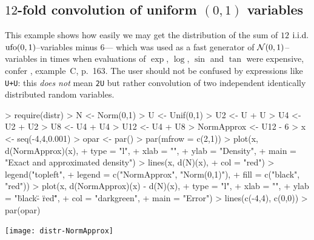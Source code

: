 \documentclass[11pt]{article}
\begin{document}
\subsection{$12$-fold convolution of uniform $(0,1)$ variables}
\begin{small}
  This example shows how easily we may get the distribution of the sum of $12$
  ${\rm i.i.d.}$ ${\rm ufo}(0,1)$--variables minus $6$--- which was used as a
  fast generator of ${\cal N}(0,1)$--variables in times when evaluations of
  $\exp$, $\log$, $\sin$ and $\tan$ were expensive, confer
  \cite{Ric:88}, example~C, p.~163. The user should not be confused by
   expressions  like {\tt U+U}: this {\em does not\/} mean {\tt 2U}
  but rather convolution of two independent identically distributed
  random variables.
\end{small}
\begin{Schunk}
\begin{Sinput}
> require(distr)
> N <- Norm(0,1)
> U <- Unif(0,1)
> U2 <- U + U
> U4 <- U2 + U2
> U8 <- U4 + U4
> U12 <- U4 + U8
> NormApprox <- U12 - 6
> x <- seq(-4,4,0.001)
> opar <- par()
> par(mfrow = c(2,1))
> plot(x, d(NormApprox)(x),
+      type = "l",
+      xlab = "",
+      ylab = "Density",
+      main = "Exact and approximated density")
> lines(x, d(N)(x),
+       col = "red")
> legend("topleft",
+        legend = c("NormApprox", "Norm(0,1)"),
+        fill = c("black", "red"))
> plot(x, d(NormApprox)(x) - d(N)(x),
+      type = "l",
+      xlab = "",
+      ylab = "\"black\" - \"red\"",
+      col = "darkgreen",
+      main = "Error")
> lines(c(-4,4), c(0,0))
> par(opar)
\end{Sinput}
\end{Schunk}
\texttt{[image: distr-NormApprox]}
\end{document}

